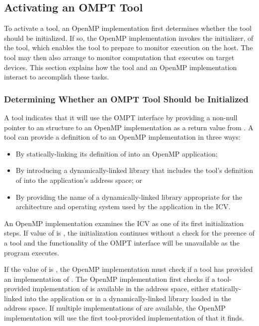 \subsection{Activating an OMPT Tool}
\label{sec:ompt-initialization}

To activate a tool, an OpenMP implementation first determines whether 
the tool should be initialized. If so, the OpenMP implementation invokes 
the initializer, of the tool, which enables the tool to prepare to monitor 
execution on the host. The tool may then also arrange to monitor computation 
that executes on target devices. This section explains how the tool and an
OpenMP implementation interact to accomplish these tasks.



\subsubsection{Determining Whether an OMPT Tool Should be Initialized}
\label{sec:ompt-check-tool}

A tool indicates that it will use the OMPT interface by providing a non-null 
pointer to an  structure to an OpenMP implementation 
as a return value from . A tool can provide a definition 
of  to an OpenMP implementation in three ways:

\begin{itemize}
\item By statically-linking its definition of  into an
      OpenMP application;
\item By introducing a dynamically-linked library that includes the tool's 
      definition of  into the application's address space; or
\item By providing the name of a dynamically-linked library appropriate for 
      the architecture and operating system used by the application in the
        ICV.
\end{itemize}

An OpenMP implementation examines the  ICV as one of its first 
initialization steps. If value of  is , the 
initialization continues without a check for the preence of a tool and the 
functionality of the OMPT interface will be unavailable as the program executes.

If the value of  is , the OpenMP implementation must 
check if a tool has provided an implementation of .  The 
OpenMP implementation first checks if a tool-provided implementation of 
 is available in the address space, either statically-linked 
into the application or in a dynamically-linked library loaded in the address
space. If multiple implementations of  are available,
the OpenMP implementation will use the first tool-provided implementation of 
 that it finds.

